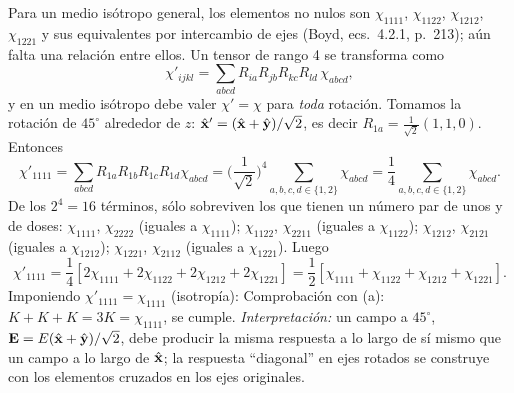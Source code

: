 Para un medio isótropo general, los elementos no nulos son $\chi_{1111}$, $\chi_{1122}$, $\chi_{1212}$, $\chi_{1221}$ y sus equivalentes por intercambio de ejes (Boyd, ecs.~4.2.1, p.~213); aún falta una relación entre ellos. Un tensor de rango 4 se transforma como
\[
\chi'_{ijkl}=\sum_{abcd}R_{ia}R_{jb}R_{kc}R_{ld}\,\chi_{abcd},
\]
y en un medio isótropo debe valer $\chi'=\chi$ para \emph{toda} rotación. Tomamos la rotación de $45^\circ$ alrededor de $z$: $\hat{\mathbf x}'=(\hat{\mathbf x}+\hat{\mathbf y})/\sqrt2$, es decir $R_{1a}=\tfrac1{\sqrt2}(1,1,0)$. Entonces
\[
\chi'_{1111}=\sum_{abcd}R_{1a}R_{1b}R_{1c}R_{1d}\chi_{abcd}=\Big(\frac{1}{\sqrt2}\Big)^4\sum_{a,b,c,d\in\{1,2\}}\chi_{abcd}=\frac14\sum_{a,b,c,d\in\{1,2\}}\chi_{abcd}.
\]
De los $2^4=16$ términos, sólo sobreviven los que tienen un número par de unos y de doses: $\chi_{1111}$, $\chi_{2222}$ (iguales a $\chi_{1111}$); $\chi_{1122}$, $\chi_{2211}$ (iguales a $\chi_{1122}$); $\chi_{1212}$, $\chi_{2121}$ (iguales a $\chi_{1212}$); $\chi_{1221}$, $\chi_{2112}$ (iguales a $\chi_{1221}$). Luego
\[
\chi'_{1111}=\frac14\left[2\chi_{1111}+2\chi_{1122}+2\chi_{1212}+2\chi_{1221}\right]=\frac12\left[\chi_{1111}+\chi_{1122}+\chi_{1212}+\chi_{1221}\right].
\]
Imponiendo $\chi'_{1111}=\chi_{1111}$ (isotropía):
Comprobación con (a): $K+K+K=3K=\chi_{1111}$, se cumple. \emph{Interpretación:} un campo a $45^\circ$, $\mathbf E=E(\hat{\mathbf x}+\hat{\mathbf y})/\sqrt2$, debe producir la misma respuesta a lo largo de sí mismo que un campo a lo largo de $\hat{\mathbf x}$; la respuesta ``diagonal'' en ejes rotados se construye con los elementos cruzados en los ejes originales.

